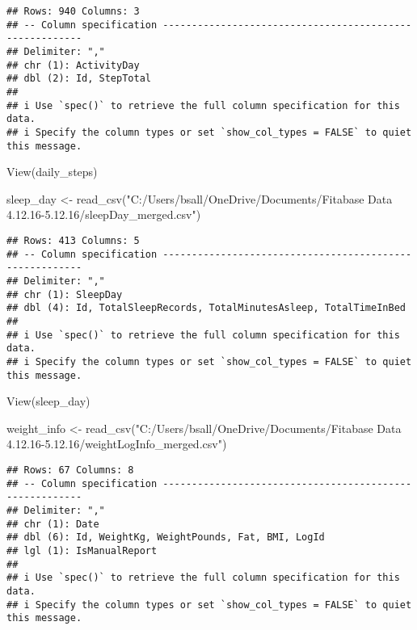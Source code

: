 \documentclass[
]{article}
\newenvironment{Shaded}{\begin{snugshade}}{\end{snugshade}}
\newcommand{\FunctionTok}[1]{\textcolor[rgb]{0.00,0.00,0.00}{#1}}
\newcommand{\NormalTok}[1]{#1}
\newcommand{\OtherTok}[1]{\textcolor[rgb]{0.56,0.35,0.01}{#1}}
\newcommand{\StringTok}[1]{\textcolor[rgb]{0.31,0.60,0.02}{#1}}
\begin{document}
\begin{verbatim}
## Rows: 940 Columns: 3
## -- Column specification --------------------------------------------------------
## Delimiter: ","
## chr (1): ActivityDay
## dbl (2): Id, StepTotal
## 
## i Use `spec()` to retrieve the full column specification for this data.
## i Specify the column types or set `show_col_types = FALSE` to quiet this message.
\end{verbatim}

\begin{Shaded}
\begin{Highlighting}[]
\FunctionTok{View}\NormalTok{(daily\_steps)}

\NormalTok{sleep\_day }\OtherTok{\textless{}{-}} \FunctionTok{read\_csv}\NormalTok{(}\StringTok{"C:/Users/bsall/OneDrive/Documents/Fitabase Data 4.12.16{-}5.12.16/sleepDay\_merged.csv"}\NormalTok{)}
\end{Highlighting}
\end{Shaded}

\begin{verbatim}
## Rows: 413 Columns: 5
## -- Column specification --------------------------------------------------------
## Delimiter: ","
## chr (1): SleepDay
## dbl (4): Id, TotalSleepRecords, TotalMinutesAsleep, TotalTimeInBed
## 
## i Use `spec()` to retrieve the full column specification for this data.
## i Specify the column types or set `show_col_types = FALSE` to quiet this message.
\end{verbatim}

\begin{Shaded}
\begin{Highlighting}[]
\FunctionTok{View}\NormalTok{(sleep\_day)}

\NormalTok{weight\_info }\OtherTok{\textless{}{-}} \FunctionTok{read\_csv}\NormalTok{(}\StringTok{"C:/Users/bsall/OneDrive/Documents/Fitabase Data 4.12.16{-}5.12.16/weightLogInfo\_merged.csv"}\NormalTok{)}
\end{Highlighting}
\end{Shaded}

\begin{verbatim}
## Rows: 67 Columns: 8
## -- Column specification --------------------------------------------------------
## Delimiter: ","
## chr (1): Date
## dbl (6): Id, WeightKg, WeightPounds, Fat, BMI, LogId
## lgl (1): IsManualReport
## 
## i Use `spec()` to retrieve the full column specification for this data.
## i Specify the column types or set `show_col_types = FALSE` to quiet this message.
\end{verbatim}
\end{document}
